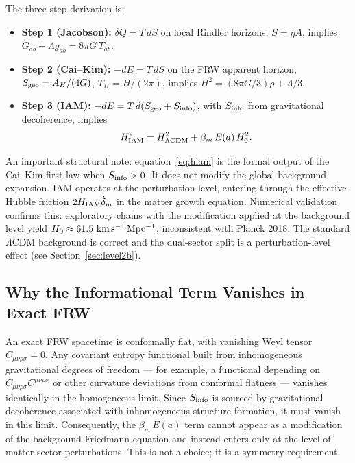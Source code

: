 \documentclass[twocolumn,a4paper,aps,prd,twocolumn,showpacs,notitlepage,superscriptaddress,nofootinbib]{article}
\newcommand{\LCDM}{$\Lambda$CDM}
\newcommand{\Ea}{E(a)}
\newcommand{\betam}{\beta_{m}}
\begin{document}
The three-step derivation is:
\begin{itemize}
  \item \textbf{Step 1 (Jacobson):} $\delta Q = T\,dS$ on local Rindler
    horizons, $S = \eta A$, implies $G_{ab} + \Lambda g_{ab} = 8\pi G\,T_{ab}$.
  \item \textbf{Step 2 (Cai--Kim):} $-dE = T\,dS$ on the FRW apparent
    horizon, $S_{\rm geo} = A_H/(4G)$, $T_H = H/(2\pi)$, implies
    $H^2 = (8\pi G/3)\rho + \Lambda/3$.
  \item \textbf{Step 3 (IAM):} $-dE = T\,d(S_{\rm geo} + S_{\rm info})$,
    with $S_{\rm info}$ from gravitational decoherence, implies
    \begin{equation}
      H_{\rm IAM}^2 = H_{\rm \Lambda CDM}^2 + \betam\,\Ea\,H_0^2.
      \label{eq:hiam}
    \end{equation}
\end{itemize}

An important structural note: equation~\eqref{eq:hiam} is the formal output of
the Cai--Kim first law when $S_{\rm info} > 0$.  It does not modify the global
background expansion.  IAM operates at the perturbation level, entering through
the effective Hubble friction $2H_{\rm IAM}\dot\delta_m$ in the matter growth
equation.  Numerical validation confirms this: exploratory chains with the
modification applied at the background level yield $H_0 \approx 61.5~\rm
km\,s^{-1}\,Mpc^{-1}$, inconsistent with Planck 2018.  The standard \LCDM{}
background is correct and the dual-sector split is a perturbation-level
effect (see Section~\ref{sec:level2b}).

\subsection{Why the Informational Term Vanishes in Exact FRW}

An exact FRW spacetime is conformally flat, with vanishing Weyl tensor
$C_{\mu\nu\rho\sigma} = 0$.  Any covariant entropy functional built from
inhomogeneous gravitational degrees of freedom --- for example, a functional
depending on $C_{\mu\nu\rho\sigma}C^{\mu\nu\rho\sigma}$ or other curvature
deviations from conformal flatness --- vanishes identically in the homogeneous
limit.  Since $S_{\rm info}$ is sourced by gravitational decoherence associated
with inhomogeneous structure formation, it must vanish in this limit.
Consequently, the $\betam\,\Ea$ term cannot appear as a modification of the
background Friedmann equation and instead enters only at the level of
matter-sector perturbations.  This is not a choice; it is a symmetry
requirement.
\end{document}
